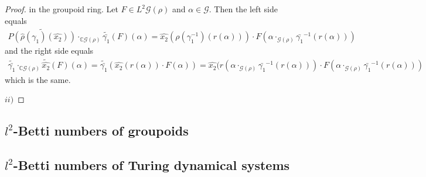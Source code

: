 \documentclass[12pt,a4paper]{scrartcl}
\numberwithin{equation}{section}
\newcommand{\C}{\mathbb{C}} %
\newcommand{\2}{\mathbb{Z} / 2 \mathbb{Z}}
\newcommand{\G}{\mathcal{G}}
\newcommand{\1}{\overline{1}}
\newcommand{\0}{\overline{0}}
\begin{document}
\begin{proof}
	in the groupoid ring.
	Let $F \in L^2 \G(\rho)$ and $\alpha \in \G$. Then the left side equals
	\begin{align*}
		\widetilde{P(\hat{\rho}(\gamma_1)(\hat{x_2}))} \cdot_{\C\G(\rho)} \widetilde{\bar{\gamma_1}}(F)(\alpha) = \hat{x_2}(\rho (\gamma_1^{-1})( r(\alpha))) \cdot F(\alpha \cdot_{\G (\rho)} \bar{\gamma_1}^{-1}(r(\alpha)))  
	\end{align*}
	and the right side equals
	\begin{align*}
		\widetilde{\bar{\gamma_1}} \cdot_{\C\G(\rho)} \tilde{\hat{x_2}}(F)(\alpha) = \widetilde{\bar{\gamma_1}}(\hat{x_2}(r(\alpha)) \cdot F(\alpha)) = \hat{x_2}(r(\alpha \cdot_{\G (\rho)} \bar{\gamma_1}^{-1}(r(\alpha))) \cdot F(\alpha \cdot_{\G (\rho)} \bar{\gamma_1}^{-1}(r(\alpha)))
	\end{align*}
	which is the same.
	
	$ii)$ 
\end{proof}
\subsection{$l^2$-Betti numbers of groupoids}
\subsection{$l^2$-Betti numbers of Turing dynamical systems}
\end{document}
